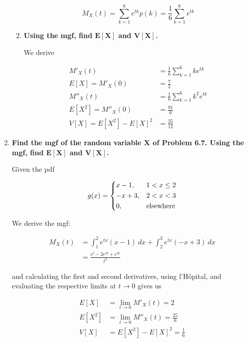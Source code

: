 \documentclass[10pt, oneside]{article}   	%
\theoremstyle{definition}
\begin{document}
\begin{enumerate}[label=10.\arabic*]
\begin{enumerate}
	\[ M_X(t) = \sum^6_{k=1} e^{tk} p(k) = \boxed{ \frac{1}{6} \sum^6_{k=1} e^{tk} } \]
	
	\item  \begin{tcolorbox}[
	  colback=Cerulean!5!white,
	  colframe=Cerulean!75!black]
	\textbf{Using the mgf, find $\bm{E[X]}$ and $\bm{V[X]}$.}
	\end{tcolorbox}
	
	We derive
	
	\begin{align*}
	M'_X(t) &= \frac{1}{6}  \sum^6_{k=1} k e^{tk} \\
	E[X] = M'_X(0) &= \boxed{\frac{7}{2}} \\
	M''_X(t) &= \frac{1}{6}  \sum^6_{k=1} k^2 e^{tk} \\
	E[X^2] = M''_X(0) &= \boxed{\frac{91}{6}} \\
	V[X] = E[X^2] - E[X]^2 &= \boxed{ \frac{35}{12} }
	\end{align*}
	
	\end{enumerate}

\item  \begin{tcolorbox}[
  colback=Cerulean!5!white,
  colframe=Cerulean!75!black]
\textbf{Find the mgf of the random variable $\bm{X}$ of Problem 6.7. Using the mgf, find $\bm{E[X]}$ and $\bm{V[X]}$.}
\end{tcolorbox}

Given the pdf

\[
g(x) = \begin{dcases}
x-1, & 1 < x \leq 2 \\
-x + 3, & 2 < x < 3 \\
0, & \text{elsewhere}
\end{dcases}
\]

We derive the mgf:

\begin{align*}
M_X(t) &= \int^2_1 e^{tx} (x-1) \ dx + \int^3_2 e^{tx} (-x+3) \ dx \\
&= \frac{e^t - 2e^{2t} + e^{3t}}{t^2}
\end{align*}

and calculating the first and second derivatives, using l'H\^{o}pital, and evaluating the respective limits at $t \rightarrow 0$ gives us

\begin{align*}
E[X] &= \lim_{t \rightarrow 0} M'_X(t) = \boxed{2} \\
E[X^2] &= \lim_{t \rightarrow 0} M''_X(t) = \frac{25}{6} \\
V[X] &= E[X^2] - E[X]^2 = \boxed{\frac{1}{6}}
\end{align*}


\end{enumerate}
\end{document}
